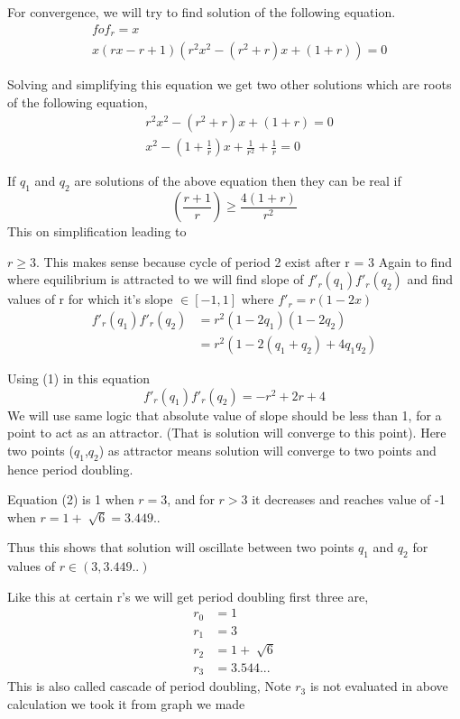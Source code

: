 \documentclass{report}
\begin{document}
For convergence, we will try to find solution of the following equation.
\begin{align}
   & fof_r = x  \nonumber\\
   & x(rx-r+1)(r^2x^2 - (r^2+r)x+(1+r)) = 0 \nonumber
\end{align}

Solving and simplifying this equation we get two other solutions which are roots of the following equation,
\begin{align}
& r^2x^2 - (r^2+r)x+(1+r) = 0 \nonumber \\
& x^2 - (1+\frac{1}{r})x + \frac{1}{r^2} + \frac{1}{r} = 0
\end{align}


If $q_1$ and $q_2$ are solutions of the above equation then they can be real if
\begin{equation}
    (\frac{r+1}{r}) \geq \frac{4(1+r)}{r^2} \nonumber
\end{equation}
This on simplification leading to \newline

$r \geq 3$. This makes sense because cycle of period 2 exist after r = 3 \newline
Again to find where equilibrium is attracted to we will find slope of $f'_r(q_1)f'_r(q_2)$ and find values of r for which it's slope $\in [-1,1]$ where $f'_r = r(1-2x)$
\begin{align}
f'_r(q_1)f'_r(q_2) &= r^2(1 - 2q_1)(1 - 2q_2) \nonumber \\
 &= r^2(1 - 2(q_1+q_2) + 4q_1q_2) \nonumber
\end{align}

Using (1) in this equation
\begin{equation}
f'_r(q_1)f'_r(q_2) = -r^2 + 2r + 4
\end{equation}
We will use same logic that absolute value of slope should be less than 1, for a point to act as an attractor. (That is solution will converge to this point). Here two points ($q_1$,$q_2$) as attractor means solution will converge to two points and hence period doubling.
\newpage

Equation (2) is 1 when $r = 3$, and for $r > 3$  it decreases and reaches value of -1 when $r = 1 + \sqrt[]{6} = 3.449..$
\newline

Thus this shows that solution will oscillate between two points $q_1$ and $q_2$ for values of $r \in (3,3.449..)$

Like this at certain r's we will get period doubling first three are,
\begin{align}
    r_0 &= 1 \nonumber \\
    r_1 &= 3 \nonumber \\
    r_2 &= 1 + \sqrt[]{6} \nonumber \\
    r_3 &= 3.544... \nonumber
\end{align}
This is also called cascade of period doubling, Note  $r_3$ is not evaluated in above calculation we took it from graph we made
\end{document}
